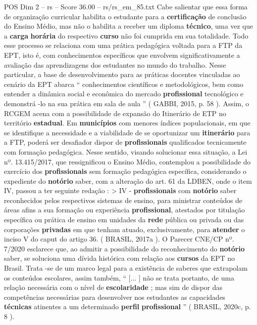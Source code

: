\begin{textsample}{POS Dim 2 – rs – Score 36.00 – rs/rs\_em\_85.txt}
Cabe salientar que essa forma de organização curricular habilita o estudante para a \textbf{certificação} de conclusão do Ensino Médio, mas não o habilita a receber um diploma \textbf{técnico}, uma vez que a \textbf{carga} \textbf{horária} do respectivo \textbf{curso} não foi cumprida em sua totalidade.
Todo esse processo se relaciona com uma prática pedagógica voltada para a FTP da EPT, isto é, com conhecimentos específicos que envolvem significativamente a avaliação das aprendizagens dos estudantes no mundo do trabalho.
Nesse particular, a base de desenvolvimento para as práticas docentes vinculadas ao cenário da EPT abarca “ conhecimentos científicos e metodológicos, bem como entender a dinâmica social e econômica do mercado \textbf{profissional} tecnológico e demonstrá -lo na sua prática em sala de aula ” ( GABBI, 2015, p. 58 ).
Assim, o RCGEM acena com a possibilidade de expansão do Itinerário de ETP no território \textbf{estadual}.
Em \textbf{municípios} com menores índices populacionais, em que se identifique a necessidade e a viabilidade de se oportunizar um \textbf{itinerário} para a FTP, poderá ser desafiador dispor de \textbf{profissionais} qualificados tecnicamente com formação pedagógica.
Nesse sentido, visando solucionar essa situação, a Lei nº. 13.415/2017, que ressignificou o Ensino Médio, contemplou a possibilidade do exercício dos \textbf{profissionais} sem formação pedagógica específica, considerando o expediente do \textbf{notório} saber, com a alteração do art. 61 da LDBEN, onde o item IV, passou a ter seguinte redação : > IV - \textbf{profissionais} com \textbf{notório} saber reconhecidos pelos respectivos sistemas de ensino, para ministrar conteúdos de áreas afins a sua formação ou experiência \textbf{profissional}, atestados por titulação específica ou prática de ensino em unidades da \textbf{rede} pública ou privada ou das corporações \textbf{privadas} em que tenham atuado, exclusivamente, para \textbf{atender} o inciso V do caput do artigo 36. ( BRASIL, 2017a ).
O Parecer CNE/CP nº. 7/2020 esclarece que, ao admitir a possibilidade do reconhecimento do \textbf{notório} saber, se soluciona uma dívida histórica com relação aos \textbf{cursos} da EPT no Brasil.
Trata -se de um marco legal para a existência de saberes que extrapolam os conteúdos escolares, assim também, “ [... ] não se trata portanto, de uma relação necessária com o nível de \textbf{escolaridade} ; mas sim de dispor das competências necessárias para desenvolver nos estudantes as capacidades \textbf{técnicas} atinentes a um determinado \textbf{perfil} \textbf{profissional} ” ( BRASIL, 2020c, p. 8 ).

\end{textsample}
